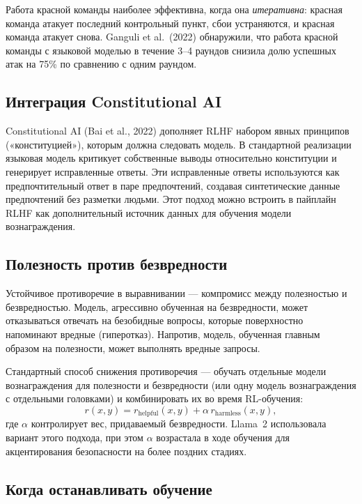 Работа красной команды наиболее эффективна, когда она \emph{итеративна}: красная команда атакует последний контрольный пункт, сбои устраняются, и красная команда атакует снова. Ganguli et al.\ (2022) обнаружили, что работа красной команды с языковой моделью в течение 3--4 раундов снизила долю успешных атак на 75\% по сравнению с одним раундом.

\subsection{Интеграция Constitutional AI}

Constitutional AI (Bai et al., 2022) дополняет RLHF набором явных принципов («конституцией»), которым должна следовать модель. В стандартной реализации языковая модель критикует собственные выводы относительно конституции и генерирует исправленные ответы. Эти исправленные ответы используются как предпочтительный ответ в паре предпочтений, создавая синтетические данные предпочтений без разметки людьми. Этот подход можно встроить в пайплайн RLHF как дополнительный источник данных для обучения модели вознаграждения.

\subsection{Полезность против безвредности}

Устойчивое противоречие в выравнивании --- компромисс между полезностью и безвредностью. Модель, агрессивно обученная на безвредности, может отказываться отвечать на безобидные вопросы, которые поверхностно напоминают вредные (гиперотказ). Напротив, модель, обученная главным образом на полезности, может выполнять вредные запросы.

Стандартный способ снижения противоречия --- обучать отдельные модели вознаграждения для полезности и безвредности (или одну модель вознаграждения с отдельными головками) и комбинировать их во время RL-обучения:
\[
r(x, y) = r_{\text{helpful}}(x, y) + \alpha\,r_{\text{harmless}}(x, y),
\]
где $\alpha$ контролирует вес, придаваемый безвредности. Llama~2 использовала вариант этого подхода, при этом $\alpha$ возрастала в ходе обучения для акцентирования безопасности на более поздних стадиях.

\subsection{Когда останавливать обучение}
\label{sec:when-stop}

